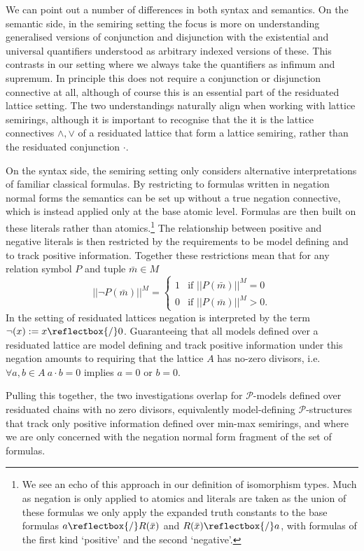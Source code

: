 \documentclass{lmcs} %
\newcommand{\?}{\ensuremath{\mkern0.4\thinmuskip}}
\newcommand{\und}{\mathord{\reflectbox{/}}}%
\newcommand{\CP}{\mathcal{P}}
\begin{document}
\begin{rem}
    We can point out a number of differences in both syntax and semantics. On the semantic side, in the semiring setting the focus is more on understanding generalised versions of conjunction and disjunction with the existential and universal quantifiers understood as arbitrary indexed versions of these. This contrasts in our setting where we always take the quantifiers as infimum and supremum. In principle this does not require a conjunction or disjunction connective at all, although of course this is an essential part of the residuated lattice setting. The two understandings naturally align when working with lattice semirings, although it is important to recognise that the it is the lattice connectives $\land,\lor$ of a residuated lattice that form a lattice semiring, rather than the residuated conjunction $\cdot$.
    
    On the syntax side, the semiring setting only considers alternative interpretations of familiar classical formulas. By restricting to formulas written in negation normal forms the semantics can be set up without a true negation connective, which is instead applied only at the base atomic level. Formulas are then built on these literals rather than atomics.\footnote{We see an echo of this approach in our definition of isomorphism types. Much as negation is only applied to atomics and literals are taken as the union of these formulas we only apply the expanded truth constants to the base formulas $a\und R(\bar{x})$ and $R(\bar{x})\und a$, with formulas of the first kind `positive' and the second `negative'.} The relationship between positive and negative literals is then restricted by the requirements to be model defining and to track positive information. Together these restrictions mean that for any relation symbol $P$ and tuple $\bar{m}\in M$ \[ ||\neg P(\bar{m})||^M=\begin{cases}
        1 & \text{if }||P(\bar{m})||^M=0\\
        0 & \text{if }||P(\bar{m})||^M>0.
    \end{cases}\] 
    In the setting of residuated lattices negation is interpreted by the term  $\neg(x):=x\und 0$. Guaranteeing that all models defined over a residuated lattice are model defining and track positive information under this negation amounts to requiring that the lattice $A$ has no-zero divisors, i.e. $\forall a,b\in A\ a\cdot b=0$ implies $a=0$ or $b=0$. 

    Pulling this together, the two investigations overlap for $\CP$-models defined over residuated chains with no zero divisors, equivalently model-defining $\CP$-structures that track only positive information defined over min-max semirings, and where we are only concerned with the negation normal form fragment of the set of formulas.
\end{rem}
\end{document}
